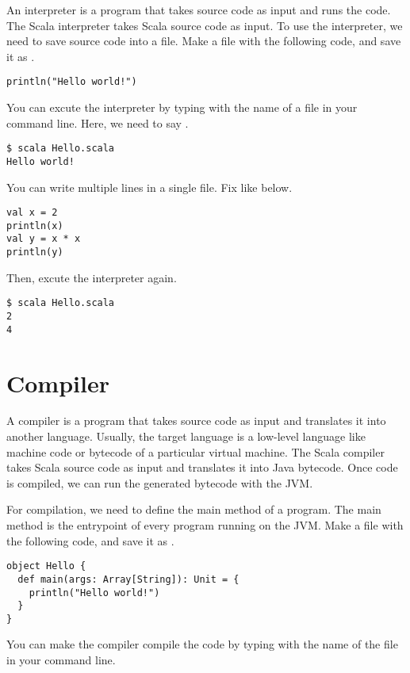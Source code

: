 An interpreter is a program that takes source code as input and runs the code.
The Scala interpreter takes Scala source code as input. To use the interpreter,
we need to save source code into a file. Make a file with the following code, and
save it as .

\begin{verbatim}
println("Hello world!")
\end{verbatim}

You can excute the interpreter by typing  with the name of a file in
your command line. Here, we need to say .

\begin{verbatim}
$ scala Hello.scala
Hello world!
\end{verbatim}

You can write multiple lines in a single file. Fix  like
below.

\begin{verbatim}
val x = 2
println(x)
val y = x * x
println(y)
\end{verbatim}

Then, excute the interpreter again.

\begin{verbatim}
$ scala Hello.scala
2
4
\end{verbatim}

\section{Compiler}

A compiler is a program that takes source code as input and translates it into
another language. Usually, the target language is a low-level language like
machine code or bytecode of a particular virtual machine.
The Scala compiler takes Scala source code as input and translates it into Java
bytecode. Once code is compiled, we can run the generated bytecode with the JVM.

For compilation, we need to define the main method of a program. The main method
is the entrypoint of every program running on the JVM.
Make a file with the following code, and save it as .

\begin{verbatim}
object Hello {
  def main(args: Array[String]): Unit = {
    println("Hello world!")
  }
}
\end{verbatim}

You can make the compiler compile the code by typing  with the name
of the file in your command line.

